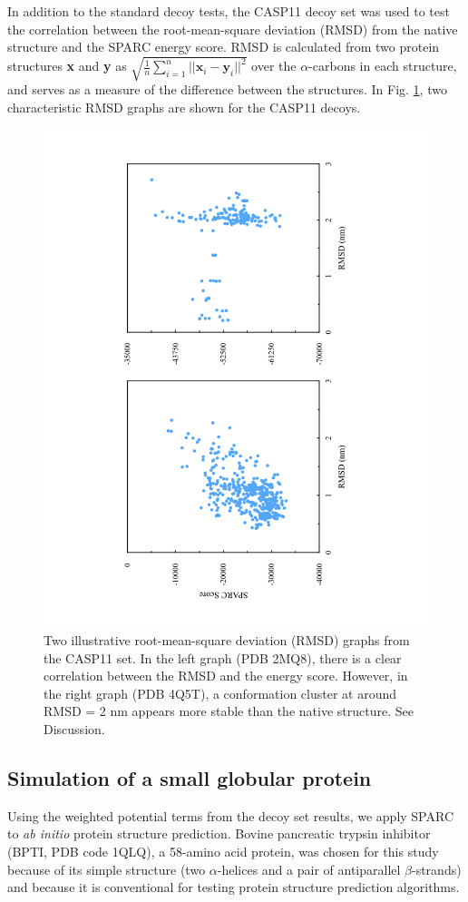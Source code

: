 \documentclass[11pt,titlepage]{article}
\begin{document}
In addition to the standard decoy tests, the CASP11 decoy set was used to test the correlation between the root-mean-square deviation (RMSD) from the native structure and the SPARC energy score.
RMSD is calculated from two protein structures \textbf{x} and \textbf{y} as $\sqrt{\frac{1}{n}\sum_{i=1}^{n}||\textbf{x}_i - \textbf{y}_i||^2}$ over the $\alpha$-carbons in each structure, and serves as a measure of the difference between the structures.
In Fig. \ref{rms_graphs}, two characteristic RMSD graphs are shown for the CASP11 decoys.

\begin{figure}
	\begin{center}
	\includegraphics[height=0.7\textwidth, angle=-90, trim=5cm 0 5cm 0]{rmsd_graph}
	\end{center}
	\caption{Two illustrative root-mean-square deviation (RMSD) graphs from the CASP11 set. In the left graph (PDB 2MQ8), there is a clear correlation between the RMSD and the energy score. However, in the right graph (PDB 4Q5T), a conformation cluster at around RMSD = 2 nm appears more stable than the native structure. See Discussion.}
	\label{rms_graphs}
\end{figure}

\subsection{Simulation of a small globular protein}
Using the weighted potential terms from the decoy set results, we apply SPARC to \textit{ab initio} protein structure prediction.
Bovine pancreatic trypsin inhibitor (BPTI, PDB code 1QLQ), a 58-amino acid protein, was chosen for this study because of its simple structure (two $\alpha$-helices and a pair of antiparallel $\beta$-strands) and because it is conventional for testing protein structure prediction algorithms.
\end{document}
